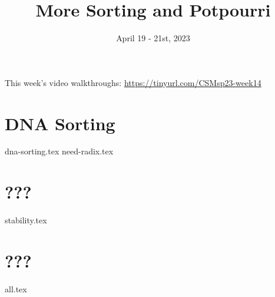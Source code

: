 \documentclass[11pt]{exam}
\title{More Sorting and Potpourri}
\date{April 19 - 21st, 2023}
\begin{document}
\maketitle
This week's video walkthroughs:
\href{https://tinyurl.com/CSMsp23-week14}{https://tinyurl.com/CSMsp23-week14}


\section{DNA Sorting}
\begin{questions}
{dna-sorting.tex}
{need-radix.tex}
\end{questions}

% 

\pagebreak
\section{???}
\begin{questions}
{stability.tex}
\end{questions} 

\pagebreak
\section{???}
\begin{questions}
{all.tex}
\end{questions}
\end{document}

